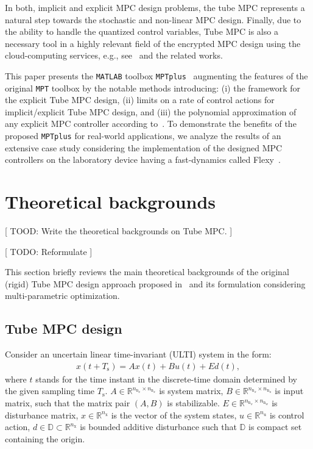 \documentclass[letterpaper, 10 pt, conference]{ieeeconf}
\begin{document}
In both, implicit and explicit MPC design problems, the tube MPC represents a natural step towards the stochastic and non-linear MPC design. Finally, due to the ability to handle the quantized control variables, Tube MPC is also a necessary tool in a highly relevant field of the encrypted MPC design using the cloud-computing services, e.g., see~\cite{DR18} and the related works.

This paper presents the \texttt{MATLAB} toolbox \texttt{MPTplus}~\cite{MPTplus} augmenting the features of the original \texttt{MPT} toolbox by the notable methods introducing: (i) the framework for the explicit Tube MPC design, (ii) limits on a rate of control actions for implicit/explicit Tube MPC design, and (iii) the polynomial approximation of any explicit MPC controller according to~\cite{KL11}. To demonstrate the benefits of the proposed \texttt{MPTplus} for real-world applications, we analyze the results of an extensive case study considering the implementation of the designed MPC controllers on the laboratory device having a fast-dynamics called Flexy~\cite{CK19}. 

\section{Theoretical backgrounds}
\label{sec:tube_mpc_theory}

[ TOOD: Write the theoretical backgrounds on Tube MPC. ]

[ TODO: Reformulate ]

This section briefly reviews the main theoretical backgrounds of the original (rigid) Tube MPC design approach proposed in~\cite{MS05} and its formulation considering multi-parametric optimization.

\subsection{Tube MPC design}
\label{sec:tube_mpc}

Consider an uncertain linear time-invariant (ULTI) system in the form:
\begin{eqnarray}
	\label{eq:ulti_system}
	x(t+T_{\mathrm{s}}) = A x(t) + B u(t) + E d(t), %
\end{eqnarray}
where $t$ stands for the time instant in the discrete-time domain determined by the given sampling time $T_{\mathrm{s}}$. $A \in \mathbb{R}^{n_{\mathrm{n}_{x}} \times n_{\mathrm{n}_{x}}}$ is system matrix, $B \in \mathbb{R}^{n_{\mathrm{n}_{x}} \times n_{\mathrm{n}_{u}}}$ is input matrix, such that the matrix pair $(A,B)$ is stabilizable. $E \in \mathbb{R}^{n_{\mathrm{n}_{x}} \times n_{\mathrm{n}_{w}}}$ is disturbance matrix, $x \in \mathbb{R}^{n_{\mathrm{x}}}$ is the vector of the system states, $u \in \mathbb{R}^{n_{\mathrm{u}}}$ is control action, $d \in \mathbb{D} \subset \mathbb{R}^{n_{\mathrm{x}}}$ is bounded additive disturbance such that $\mathbb{D}$ is compact set containing the origin. 
\end{document}
